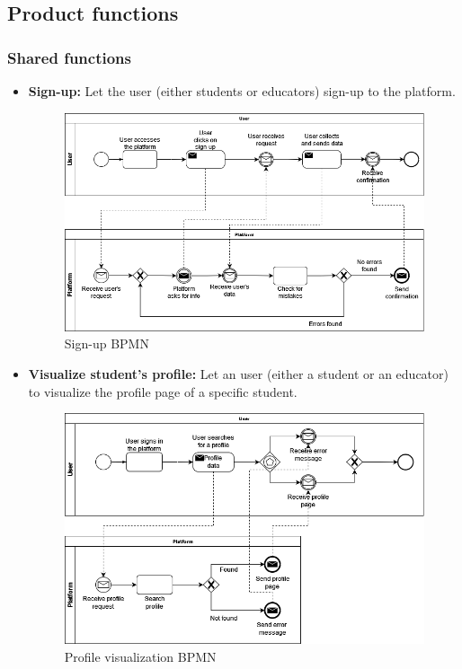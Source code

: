 \documentclass{article}
\begin{document}
{\newpage

\subsection{Product functions}
\subsubsection{Shared functions}
\begin{itemize}
    \item \textbf{Sign-up:} Let the user (either students or educators) sign-up to the platform.
          \begin{figure}[H]
              \centering
              \includegraphics[scale=0.4]{images/BPMN/BPMN1.png}
              \caption{Sign-up BPMN}
              \label{fig:signUpBPMN}
          \end{figure}

    \item \textbf{Visualize student's profile:} Let an user (either a student or an educator) to visualize the profile page of a specific student.
          \begin{figure}[H]
              \centering
              \includegraphics[scale=0.4]{images/BPMN/BPMN2.png}
              \caption{Profile visualization BPMN}
              \label{fig:profileVisualizationBPMN}
          \end{figure}
\end{itemize}

}
\end{document}
